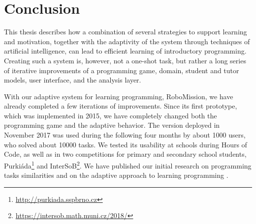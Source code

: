 \chapter{Conclusion}
\label{chap:conclusion}



This thesis describes how a combination of several strategies to support
learning and motivation, together with the adaptivity of the system
through techniques of artificial intelligence,
can lead to efficient learning of introductory programming. %
Creating such a system is, however, not a one-shot task, but rather a long series
of iterative improvements of a programming game,
domain, student and tutor models, user interface, and the analysis layer.

With our adaptive system for learning programming, RoboMission,
we have already completed a few iterations of improvements.
Since its first prototype, which was implemented in 2015,
we have completely changed both the programming game and the adaptive behavior.
The version deployed in November 2017 was used during the following four months
by about 1000 users, who solved about 10000 tasks.
We tested its usability at schools during Hours of Code,
as well as in two competitions for primary and secondary school students,
Purkiáda\footnote{\url{http://purkiada.sspbrno.cz}} and
InterSoB\footnote{\url{https://intersob.math.muni.cz/2018/}}.
We have published  our initial research on programming tasks similarities \cite{alg.similarity}
and on the adaptive approach to learning programming \cite{robomission}.




